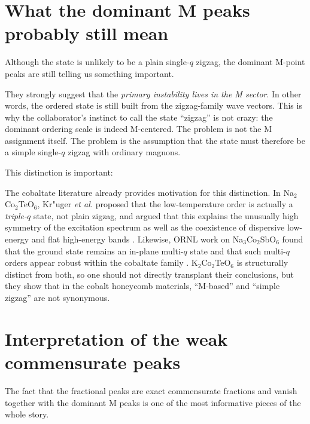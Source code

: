 \documentclass[11pt]{article}
\begin{document}
\section{What the dominant M peaks probably still mean}

Although the state is unlikely to be a plain single-$q$ zigzag, the dominant M-point peaks are still telling us something important.

They strongly suggest that the \emph{primary instability lives in the M sector}. In other words, the ordered state is still built from the zigzag-family wave vectors. This is why the collaborator's instinct to call the state ``zigzag'' is not crazy: the dominant ordering scale is indeed M-centered. The problem is not the M assignment itself. The problem is the assumption that the state must therefore be a simple single-$q$ zigzag with ordinary magnons.

This distinction is important:
\begin{center}
\end{center}

The cobaltate literature already provides motivation for this distinction. In Na$_2$Co$_2$TeO$_6$, Kr"uger \emph{et al.} proposed that the low-temperature order is actually a \emph{triple-$q$} state, not plain zigzag, and argued that this explains the unusually high symmetry of the excitation spectrum as well as the coexistence of dispersive low-energy and flat high-energy bands \cite{Kruger2023TripleQNCTO}. Likewise, ORNL work on Na$_3$Co$_2$SbO$_6$ found that the ground state remains an in-plane multi-$q$ state and that such multi-$q$ orders appear robust within the cobaltate family \cite{Maksimov2024NCSOmultiq}. K$_2$Co$_2$TeO$_6$ is structurally distinct from both, so one should not directly transplant their conclusions, but they show that in the cobalt honeycomb materials, ``M-based'' and ``simple zigzag'' are not synonymous.

\section{Interpretation of the weak commensurate peaks}

The fact that the fractional peaks are exact commensurate fractions and vanish together with the dominant M peaks is one of the most informative pieces of the whole story.
\end{document}
